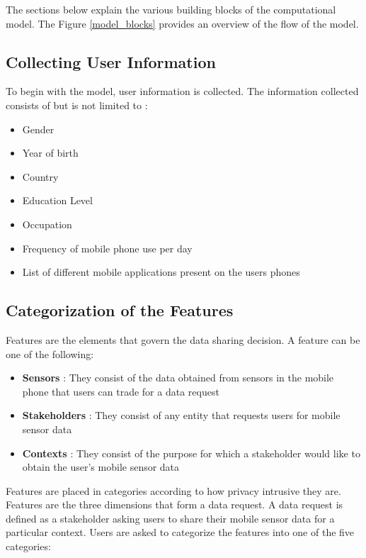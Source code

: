 The sections below explain the various building blocks of the computational model. The Figure \ref{model_blocks}
provides an overview of the flow of the model.

\subsection{Collecting User Information}
To begin with the model, user information is collected. The information collected consists of but is not limited to :

\begin{itemize}
\item Gender
\item Year of birth
\item Country
\item Education Level
\item Occupation
\item Frequency of mobile phone use per day
\item List of different mobile applications present on the users phones
\end{itemize}

\subsection{Categorization of the Features} \label{catfeatures}

Features are the elements that govern the data sharing decision. A feature can be one of the following:
\begin{itemize}
\item \textbf{Sensors} : They consist of the data obtained from sensors in the mobile phone that users can trade for a data request
\item \textbf{Stakeholders} : They consist of any entity that requests users for mobile sensor data
\item \textbf{Contexts} : They consist of the purpose for which a stakeholder would like to obtain the user's mobile sensor data
\end{itemize}

Features are placed in categories according to how privacy intrusive they are. Features are the three dimensions that form a data request. A data request is defined as a stakeholder asking users to share their mobile sensor data for a particular context. Users are asked to categorize the features into one of the five categories:

